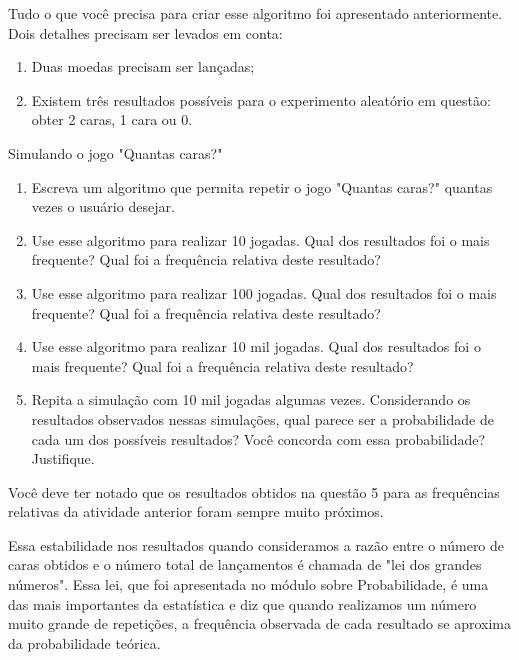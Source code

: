 Tudo o que você precisa para criar esse algoritmo foi apresentado anteriormente. Dois detalhes precisam ser levados em conta:

\begin{enumerate}[label=\titem{\arabic*}]
\item Duas moedas precisam ser lançadas;
\item Existem três resultados possíveis para o experimento aleatório em questão: obter 2 caras, 1 cara ou 0.
\end{enumerate}

\begin{task}{Simulando o jogo "Quantas caras?"}
\begin{enumerate}
\item Escreva um algoritmo que permita repetir o jogo "Quantas caras?"{} quantas vezes o usuário desejar.

\item Use esse algoritmo para realizar 10 jogadas. Qual dos resultados foi o mais frequente? Qual foi a frequência relativa deste resultado?

\item Use esse algoritmo para realizar 100 jogadas. Qual dos resultados foi o mais frequente? Qual foi a frequência relativa deste resultado?

\item Use esse algoritmo para realizar 10 mil jogadas. Qual dos resultados foi o mais frequente? Qual foi a frequência relativa deste resultado?

\item Repita a simulação com 10 mil jogadas algumas vezes. Considerando os resultados observados nessas simulações, qual parece ser a probabilidade de cada um dos possíveis resultados? Você concorda com essa probabilidade? Justifique.
\end{enumerate}
\end{task}

\label{comp-arr9}

Você deve ter notado que os resultados obtidos na questão 5 para as frequências relativas da atividade anterior foram sempre muito próximos.

Essa estabilidade nos resultados quando consideramos a razão entre o número de caras obtidos e o número total de lançamentos é chamada de "lei dos grandes números". Essa lei, que foi apresentada no módulo sobre Probabilidade, é uma das mais importantes da estatística e diz que quando realizamos um número muito grande de repetições, a frequência observada de cada resultado se aproxima da probabilidade teórica.

